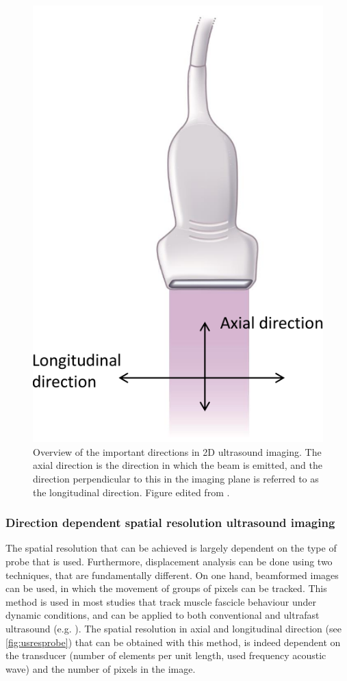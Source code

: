 \begin{figure}
	\centering
	\includegraphics[width=0.9\linewidth]{Figures/Ultrasound/us_res_probe.pdf} 
	\caption{Overview of the important directions in 2D ultrasound imaging. The axial direction is the direction in which the beam is emitted, and the direction perpendicular to this in the imaging plane is referred to as the longitudinal direction. Figure edited from \citet{martin_basic_2011}.}
	\label{fig:usresprobe}
\end{figure} \leavevmode

\subsubsection{Direction dependent spatial resolution ultrasound imaging}
The spatial resolution that can be achieved is largely dependent on the type of probe that is used. Furthermore, displacement analysis can be done using two techniques, that are fundamentally different. On one hand, beamformed images can be used, in which the movement of groups of pixels can be tracked. This method is used in most studies that track muscle fascicle behaviour under dynamic conditions, and can be applied to both conventional and ultrafast ultrasound (e.g. \cite{farris_ultratrack_2016, farcy_interaction_2014, hauraix_muscle_2017, af_klint_sudden_2009, cronin_triceps_2015, cronin_automatic_2011}). The spatial resolution in axial and longitudinal direction (see \autoref{fig:usresprobe}) that can be obtained with this method, is indeed dependent on the transducer (number of elements per unit length, used frequency acoustic wave) and the number of pixels in the image. 

